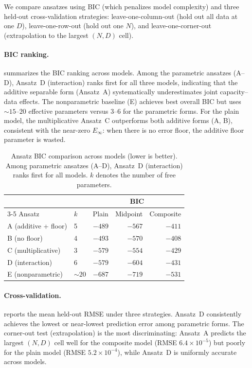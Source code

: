 \documentclass[11pt]{article}
\begin{document}
We compare ansatzes using BIC (which penalizes model complexity) and three held-out cross-validation strategies: leave-one-column-out (hold out all data at one $D$), leave-one-row-out (hold out one $N$), and leave-one-corner-out (extrapolation to the largest $(N,D)$ cell).

\paragraph{BIC ranking.}
 summarizes the BIC ranking across models.
Among the parametric ansatzes (A--D), Ansatz~D (interaction) ranks first for all three models, indicating that the additive separable form (Ansatz~A) systematically underestimates joint capacity--data effects.
The nonparametric baseline (E) achieves best overall BIC but uses $\sim\!15$--$20$ effective parameters versus 3--6 for the parametric forms.
For the plain model, the multiplicative Ansatz~C outperforms both additive forms (A, B), consistent with the near-zero $E_\infty$: when there is no error floor, the additive floor parameter is wasted.

\begin{table}[H]
    \centering
    \caption{Ansatz BIC comparison across models (lower is better).
    Among parametric ansatzes (A--D), Ansatz~D (interaction) ranks first for all models.
    $k$ denotes the number of free parameters.}
    \label{tab:ansatz-bic}
    \small
    \begin{tabular}{llrrr}
        \toprule
        & & \multicolumn{3}{c}{BIC} \\
        \cmidrule(lr){3-5}
        Ansatz & $k$ & Plain & Midpoint & Composite \\
        \midrule
        A (additive + floor)  & 5 & $-489$ & $-567$ & $-411$ \\
        B (no floor)          & 4 & $-493$ & $-570$ & $-408$ \\
        C (multiplicative)    & 3 & $-579$ & $-554$ & $-429$ \\
        D (interaction)       & 6 & $-579$ & $-604$ & $-431$ \\
        E (nonparametric)     & $\sim\!20$ & $-687$ & $-719$ & $-531$ \\
        \bottomrule
    \end{tabular}
\end{table}

\paragraph{Cross-validation.}
 reports the mean held-out RMSE under three strategies.
Ansatz~D consistently achieves the lowest or near-lowest prediction error among parametric forms.
The corner-out test (extrapolation) is the most discriminating: Ansatz~A predicts the largest $(N,D)$ cell well for the composite model (RMSE $6.4 \times 10^{-5}$) but poorly for the plain model (RMSE $5.2 \times 10^{-4}$), while Ansatz~D is uniformly accurate across models.
\end{document}
